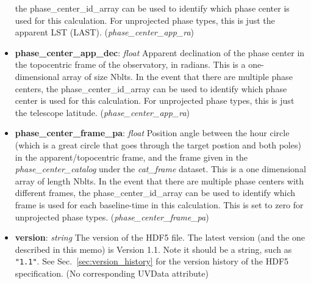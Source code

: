 \documentclass[11pt, oneside]{article}
\begin{document}
\begin{itemize}
the phase\_center\_id\_array can be used to identify which phase center is used for this
calculation. For unprojected phase types, this is just the apparent LST (LAST). (\textit{phase\_center\_app\_ra})
\item \textbf{phase\_center\_app\_dec}: \textit{float}
Apparent declination of the phase center in the topocentric frame of the observatory, in radians.
This is a one-dimensional array of size Nblts. In the event that there are multiple phase centers,
the phase\_center\_id\_array can be used to identify which phase center is used for this
calculation. For unprojected phase types, this is just the telescope latitude.
(\textit{phase\_center\_app\_ra})
\item \textbf{phase\_center\_frame\_pa}: \textit{float}
Position angle between the hour circle (which is a great circle that goes through the target
postion and both poles) in the apparent/topocentric frame, and the frame given in the
\textit{phase\_center\_catalog} under the \textit{cat\_frame} dataset. This is a one dimensional array
of length Nblts. In the event that there are multiple phase centers with different frames,
the phase\_center\_id\_array can be used to identify which frame is used for each
baseline-time in this calculation. This is set to zero for unprojected phase types.
(\textit{phase\_center\_frame\_pa})

\item \textbf{version}: \textit{string} The version of the HDF5 file. The latest
  version (and the one described in this memo) is Version 1.1. Note it should be
  a string, such as \verb+"1.1"+. See Sec.~\ref{sec:version_history} for the
  version history of the HDF5 specification. (No corresponding UVData attribute)
\end{itemize}
\end{document}
